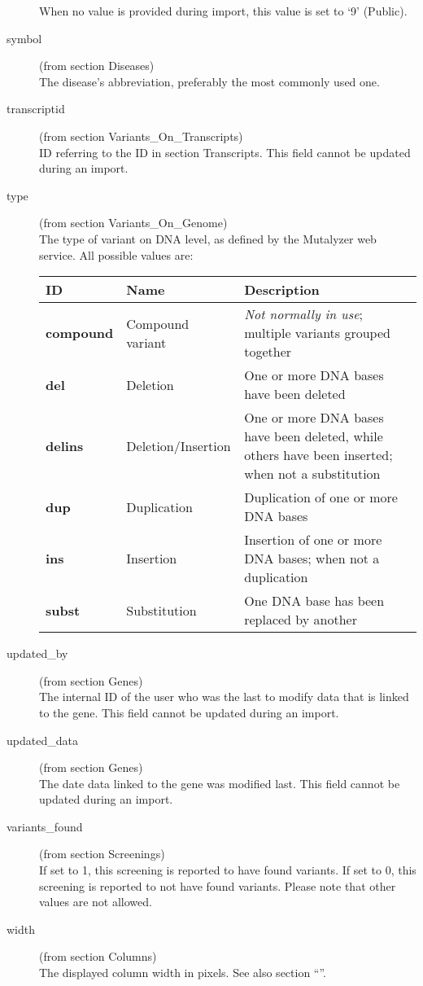 \begin{description}
  When no value is provided during import, this value is set to `9' (Public).
  \item[symbol] (from section Diseases) \hfill \\
  The disease's abbreviation, preferably the most commonly used one.
  \item[transcriptid] (from section Variants\_On\_Transcripts) \hfill \\
  ID referring to the ID in section Transcripts.
  This field cannot be updated during an import.
  \item[type] (from section Variants\_On\_Genome)\hfill \\
  The type of variant on DNA level, as defined by the Mutalyzer web service.
  All possible values are:\\
  \begin{tabular}{>{\bfseries}p{2.2cm} p{3.4cm} p{9cm}}
    ID & \textbf{Name} & \textbf{Description}\\ \hline \hline
    compound & Compound variant & \emph{Not normally in use}; multiple variants grouped together\\ \hline
    del & Deletion & One or more DNA bases have been deleted\\ \hline
    delins & Deletion/Insertion & One or more DNA bases have been deleted, while others have been inserted; when not a
      substitution\\ \hline
    dup & Duplication & Duplication of one or more DNA bases\\ \hline
    ins & Insertion & Insertion of one or more DNA bases; when not a duplication\\ \hline
    subst & Substitution & One DNA base has been replaced by another\\ \hline
  \end{tabular}
  \item[updated\_by] (from section Genes)\hfill \\
  The internal ID of the user who was the last to modify data that is linked to the gene.
  This field cannot be updated during an import.
  \item[updated\_data] (from section Genes)\hfill \\
  The date data linked to the gene was modified last.
  This field cannot be updated during an import.
  \item[variants\_found] (from section Screenings)\hfill \\
  If set to 1, this screening is reported to have found variants.
  If set to 0, this screening is reported to not have found variants.
  Please note that other values are not allowed.
  \item[width] (from section Columns)\hfill \\
  The displayed column width in pixels.
  See also section ``''.
\end{description}
